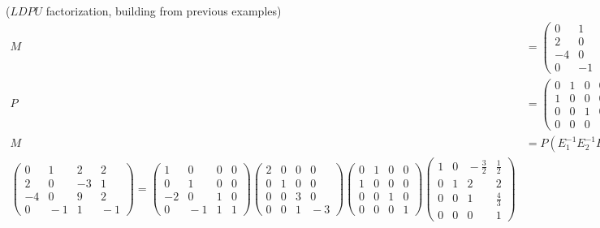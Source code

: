 \begin{example} ($LDPU$ factorization, building from previous examples)
\begin{align*}
M&=
\begin{pmatrix}
0&1&2&2\\
2&0&-3&1\\
-4&0&9&2\\
0&-1&1&-1
\end{pmatrix}
\stackrel{P}{\sim}
\begin{pmatrix}
2&0&-3&1\\
0&1&2&2\\
-4&0&9&2\\
0&-1&1&-1
\end{pmatrix}
\stackrel{E_6E_5E_4E_3E_2E_1}{\sim} L\\
P&=
\begin{pmatrix}
0&1&0&0\\
1&0&0&0\\
0&0&1&0\\
0&0&0&1
\end{pmatrix}
=P^{-1}\\
M&=P(E_1^{-1}E_2^{-1}E_3^{-1})(E_4^{-1}E_5^{-1}E_6^{-1}) (E_7^{-1}) U=PLDU\\
\!\!\!\begin{pmatrix}
0&1&2&2\\
2&0&-3&1\\
-4&0&9&2\\
0&\!\!-1&1&\!\!-1
\end{pmatrix}
=
\begin{pmatrix}
1&0&0&0\\
0&1&0&0\\
-2&0&1&0\\
0&\!\!-1&1&1
\end{pmatrix} 
\!\!\!
\begin{pmatrix}
2&0&0&0\\
0&1&0&0\\
0&0&3&0\\
0&0&1&\!\!\!-3
\end{pmatrix} 
\!\!\!
\begin{pmatrix}
0&1&0&0\\
1&0&0&0\\
0&0&1&0\\
0&0&0&1
\end{pmatrix}
\!\!\!
\begin{pmatrix}
1&0&\!\!-\frac{3}{2}&\frac{1}{2}\\
0&1&2&2\\
0&0&1&\frac43\\
0&0&0&1
\end{pmatrix}
\end{align*}

\end{example}

